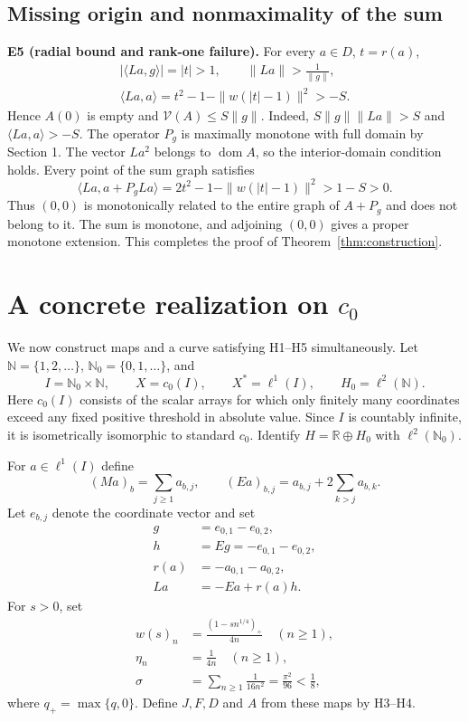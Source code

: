 \documentclass[11pt,a4paper]{article}
\begin{document}
\subsection{Missing origin and nonmaximality of the sum}

\textbf{E5 (radial bound and rank-one failure).} For every $a\in D$, $t=r(a)$,
\[
\begin{gathered}
|\langle La,g\rangle|=|t|>1,\qquad
\|La\|>\frac{1}{\|g\|},\\
\langle La,a\rangle=t^2-1-\|w(|t|-1)\|^2>-S.
\end{gathered}
\tag{E7}
\]
Hence $A(0)$ is empty and $\mathcal V(A)\le S\|g\|$. Indeed, $S\|g\|\|La\|>S$ and $\langle La,a\rangle>-S$. The operator $P_g$ is maximally monotone with full domain by Section 1. The vector $La^2$ belongs to $\operatorname{dom}A$, so the interior-domain condition holds. Every point of the sum graph satisfies
\[
\langle La,a+P_gLa\rangle
=2t^2-1-\|w(|t|-1)\|^2>1-S>0.
\tag{E8}
\]
Thus $(0,0)$ is monotonically related to the entire graph of $A+P_g$ and does not belong to it. The sum is monotone, and adjoining $(0,0)$ gives a proper monotone extension. This completes the proof of Theorem~\ref{thm:construction}.

\section{A concrete realization on $c_0$}

We now construct maps and a curve satisfying H1--H5 simultaneously. Let $\mathbb N=\{1,2,\ldots\}$, $\mathbb N_0=\{0,1,\ldots\}$, and
\[
I=\mathbb N_0\times\mathbb N,\qquad
X=c_0(I),\qquad X^*=\ell^1(I),\qquad
H_0=\ell^2(\mathbb N).
\]
Here $c_0(I)$ consists of the scalar arrays for which only finitely many coordinates exceed any fixed positive threshold in absolute value. Since $I$ is countably infinite, it is isometrically isomorphic to standard $c_0$. Identify $H=\mathbb R\oplus H_0$ with $\ell^2(\mathbb N_0)$.

For $a\in\ell^1(I)$ define
\[
(Ma)_b=\sum_{j\ge1}a_{b,j},\qquad
(Ea)_{b,j}=a_{b,j}+2\sum_{k>j}a_{b,k}.
\tag{C1}
\]
Let $e_{b,j}$ denote the coordinate vector and set
\[
\begin{aligned}
g&=e_{0,1}-e_{0,2},\\
h&=Eg=-e_{0,1}-e_{0,2},\\
r(a)&=-a_{0,1}-a_{0,2},\\
La&=-Ea+r(a)h.
\end{aligned}
\tag{C2}
\]
For $s>0$, set
\[
\begin{aligned}
w(s)_n&=\frac{(1-sn^{1/4})_+}{4n}\quad(n\ge1),\\
\eta_n&=\frac{1}{4n}\quad(n\ge1),\\
\sigma&=\sum_{n\ge1}\frac{1}{16n^2}=\frac{\pi^2}{96}<\frac18,
\end{aligned}
\tag{C3}
\]
where $q_+=\max\{q,0\}$. Define $J,F,D$ and $A$ from these maps by H3--H4.
\end{document}
